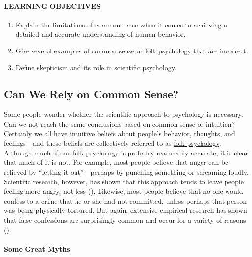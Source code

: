 \documentclass[
]{krantz}
\providecommand{\tightlist}{%
  \setlength{\itemsep}{0pt}\setlength{\parskip}{0pt}}
\begin{document}
\paragraph*{LEARNING OBJECTIVES}\label{learning-objectives-2}

\begin{enumerate}
\def\labelenumi{\arabic{enumi}.}
\tightlist
\item
  Explain the limitations of common sense when it comes to achieving a detailed and accurate understanding of human behavior.
\item
  Give several examples of common sense or folk psychology that are incorrect.
\item
  Define skepticism and its role in scientific psychology.
\end{enumerate}

\subsection*{Can We Rely on Common Sense?}\label{can-we-rely-on-common-sense}


Some people wonder whether the scientific approach to psychology is necessary. Can we not reach the same conclusions based on common sense or intuition? Certainly we all have intuitive beliefs about people's behavior, thoughts, and feelings---and these beliefs are collectively referred to as \hyperref[folk-psychology]{folk psychology}. Although much of our folk psychology is probably reasonably accurate, it is clear that much of it is not. For example, most people believe that anger can be relieved by ``letting it out''---perhaps by punching something or screaming loudly. Scientific research, however, has shown that this approach tends to leave people feeling more angry, not less (). Likewise, most people believe that no one would confess to a crime that he or she had not committed, unless perhaps that person was being physically tortured. But again, extensive empirical research has shown that false confessions are surprisingly common and occur for a variety of reasons ().

\paragraph*{Some Great Myths}\label{some-great-myths}
\end{document}
